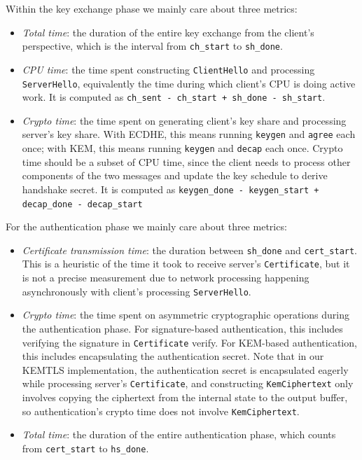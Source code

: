\documentclass[letterpaper,12pt,titlepage,oneside,final]{book}
\begin{document}
Within the key exchange phase we mainly care about three metrics: \begin{itemize}
    \item \emph{Total time}: the duration of the entire key exchange from the client's perspective, which is the interval from \texttt{ch\_start} to \texttt{sh\_done}.
    \item \emph{CPU time}: the time spent constructing \texttt{ClientHello} and processing \texttt{ServerHello}, equivalently the time during which client's CPU is doing active work. It is computed as \texttt{ch\_sent - ch\_start + sh\_done - sh\_start}.
    \item \emph{Crypto time}: the time spent on generating client's key share and processing server's key share. With ECDHE, this means running \texttt{keygen} and \texttt{agree} each once; with KEM, this means running \texttt{keygen} and \texttt{decap} each once. Crypto time should be a subset of CPU time, since the client needs to process other components of the two messages and update the key schedule to derive handshake secret. It is computed as \texttt{keygen\_done - keygen\_start + decap\_done - decap\_start}
\end{itemize}

For the authentication phase we mainly care about three metrics: \begin{itemize}
    \item \emph{Certificate transmission time}: the duration between \texttt{sh\_done} and \texttt{cert\_start}.
    This is a heuristic of the time it took to receive server's \texttt{Certificate}, but it is not a precise measurement due to network processing happening asynchronously with client's processing \texttt{ServerHello}.
    \item \emph{Crypto time}: the time spent on asymmetric cryptographic operations during the authentication phase. For signature-based authentication, this includes verifying the signature in \texttt{Certificate} verify. For KEM-based authentication, this includes encapsulating the authentication secret. Note that in our KEMTLS implementation, the authentication secret is encapsulated eagerly while processing server's \texttt{Certificate}, and constructing \texttt{KemCiphertext} only involves copying the ciphertext from the internal state to the output buffer, so authentication's crypto time does not involve \texttt{KemCiphertext}.
    \item \emph{Total time}: the duration of the entire authentication phase, which counts from \texttt{cert\_start} to \texttt{hs\_done}.
\end{itemize}
\end{document}
